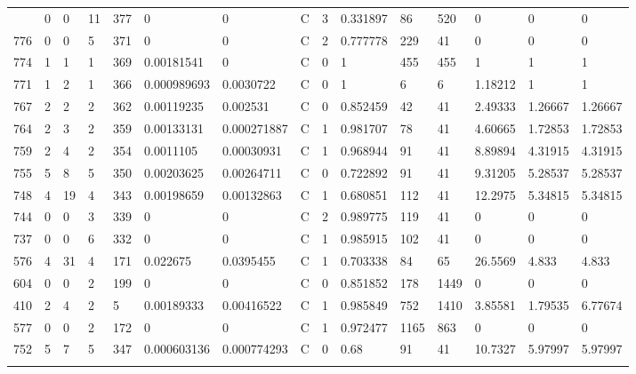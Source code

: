 \begin{latin}
\begin{longtable}{lllllllllllllll}
\begin{comment}
	782 & 0  & 0   & 11 & 377 & 0              & 0              & C & 3  & 0.331897 & 86   & 520  & 0       & 0       & 0       \\
	776 & 0  & 0   & 5  & 371 & 0              & 0              & C & 2  & 0.777778 & 229  & 41   & 0       & 0       & 0       \\
	774 & 1  & 1   & 1  & 369 & 0.00181541     & 0              & C & 0  & 1        & 455  & 455  & 1       & 1       & 1       \\
	771 & 1  & 2   & 1  & 366 & 0.000989693    & 0.0030722      & C & 0  & 1        & 6    & 6    & 1.18212 & 1       & 1       \\
	767 & 2  & 2   & 2  & 362 & 0.00119235     & 0.002531       & C & 0  & 0.852459 & 42   & 41   & 2.49333 & 1.26667 & 1.26667 \\
	764 & 2  & 3   & 2  & 359 & 0.00133131     & 0.000271887    & C & 1  & 0.981707 & 78   & 41   & 4.60665 & 1.72853 & 1.72853 \\
	759 & 2  & 4   & 2  & 354 & 0.0011105      & 0.00030931     & C & 1  & 0.968944 & 91   & 41   & 8.89894 & 4.31915 & 4.31915 \\
	755 & 5  & 8   & 5  & 350 & 0.00203625     & 0.00264711     & C & 0  & 0.722892 & 91   & 41   & 9.31205 & 5.28537 & 5.28537 \\
	748 & 4  & 19  & 4  & 343 & 0.00198659     & 0.00132863     & C & 1  & 0.680851 & 112  & 41   & 12.2975 & 5.34815 & 5.34815 \\
	744 & 0  & 0   & 3  & 339 & 0              & 0              & C & 2  & 0.989775 & 119  & 41   & 0       & 0       & 0       \\
	737 & 0  & 0   & 6  & 332 & 0              & 0              & C & 1  & 0.985915 & 102  & 41   & 0       & 0       & 0       \\
	576 & 4  & 31  & 4  & 171 & 0.022675       & 0.0395455      & C & 1  & 0.703338 & 84   & 65   & 26.5569 & 4.833   & 4.833   \\
	604 & 0  & 0   & 2  & 199 & 0              & 0              & C & 0  & 0.851852 & 178  & 1449 & 0       & 0       & 0       \\
	410 & 2  & 4   & 2  & 5   & 0.00189333     & 0.00416522     & C & 1  & 0.985849 & 752  & 1410 & 3.85581 & 1.79535 & 6.77674 \\
	577 & 0  & 0   & 2  & 172 & 0              & 0              & C & 1  & 0.972477 & 1165 & 863  & 0       & 0       & 0       \\
	752 & 5  & 7   & 5  & 347 & 0.000603136    & 0.000774293    & C & 0  & 0.68     & 91   & 41   & 10.7327 & 5.97997 & 5.97997 \\

\end{comment}
\end{longtable}
\end{latin}
